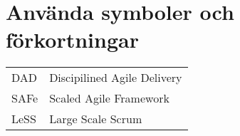 %
%


\section*{Använda symboler och förkortningar}

\begin{center}
\begin{tabular}{p{}p{}}
DAD & Discipilined Agile Delivery \\ 
SAFe & Scaled Agile Framework \\ 
LeSS & Large Scale Scrum \\

\end{tabular}
\end{center}

\vspace{10mm}



